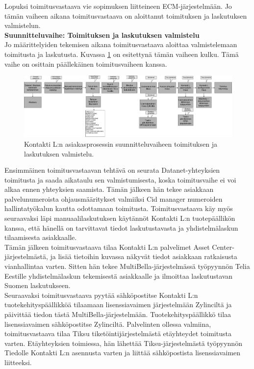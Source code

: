 \documentclass[finnish,12pt,a4paper,pdftex]{article}
\begin{document}
Lopuksi toimitusvastaava vie sopimuksen liitteineen ECM-järjestelmään. Jo tämän vaiheen aikana toimitusvastaava on aloittanut toimituksen ja laskutuksen valmistelun.\\ 

\textbf{Suunnitteluvaihe: Toimituksen ja laskutuksen valmistelu}\\

Jo määrittelyiden tekemisen aikana toimitusvastaava aloittaa valmistelemaan toimitusta ja laskutusta. Kuvassa \ref{fig:valmtoimlask} on esitettynä tämän vaiheen kulku. Tämä vaihe on osittain päällekäinen toimitusvaiheen kanssa.

\begin{figure}[!h]
    \centering
    \includegraphics[scale=0.2]{images/valmtoimlask.pdf}
    \caption{Kontakti L:n asiakasprosessin suunnitteluvaiheen toimituksen ja laskutuksen valmistelu.}
    \label{fig:valmtoimlask}
\end{figure}

Ensimmäinen toimitusvastaavan tehtävä on seurata Datanet-yhteyksien toimitusta ja saada aikataulu sen valmistumisesta, koska toimitusvaihe ei voi alkaa ennen yhteyksien saamista. Tämän jälkeen hän tekee asiakkaan palvelunumeroista ohjausmääritykset valmiiksi Cid manager numeroiden hallintatyökalun kautta odottamaan toimitusta. Toimitusvastaava käy myös seuraavaksi läpi manuaalilaskutuksen käytännöt Kontakti L:n tuotepäällikön kanssa, että hänellä on tarvittavat tiedot laskutustavasta ja yhdistelmälaskun tilaamisesta asiakkaalle.\\

Tämän jälkeen toimitusvastaava tilaa Kontakti L:n palvelimet Asset Center-järjestelmästä, ja lisää tietoihin kuvassa näkyvät tiedot asiakkaan ratkaisusta vianhallintaa varten. Sitten hän tekee MultiBella-järjestelmässä työpyynnön Telia Eestille yhdistelmälaskun tekemisestä asiakkaalle ja ilmoittaa laskutustavan Suomen laskutukseen.\\

Seuraavaksi toimitusvastaava pyytää sähköpostitse Kontakti L:n tuotekehityspäällikköä tilaamaan lisenssiavaimen järjestelmään Zylinciltä ja päivittää tiedon tästä MultiBella-järjestelmään. Tuotekehityspäällikkö tilaa lisenssiavaimen sähköpostitse Zylinciltä. Palvelinten ollessa valmiina, toimitusvastaava tilaa Tiksu tiketöintijärjestelmästä etäyhteydet toimitusta varten. Etäyhteyksien toimiessa, hän lähettää Tiksu-järjestelmästä työpyynnön Tiedolle Kontakti L:n asennusta varten ja liittää sähköpostista lisenssiavaimen liitteeksi.\\
\end{document}
